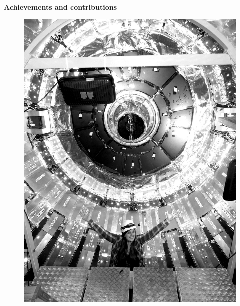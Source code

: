 \cleardoublepage\thispagestyle{empty}

\begin{center}
	\vspace*{10mm}
     
	\huge \textbf{Achievements and contributions}

	\vspace{10mm}
\begin{figure}[th]
	\centering
	\includegraphics[width=0.5\linewidth]{./isis}
\end{figure}
\vspace{10mm}



\end{center}

\cleardoublepage
\setlength{\topmargin}{0mm}
\normalsize%